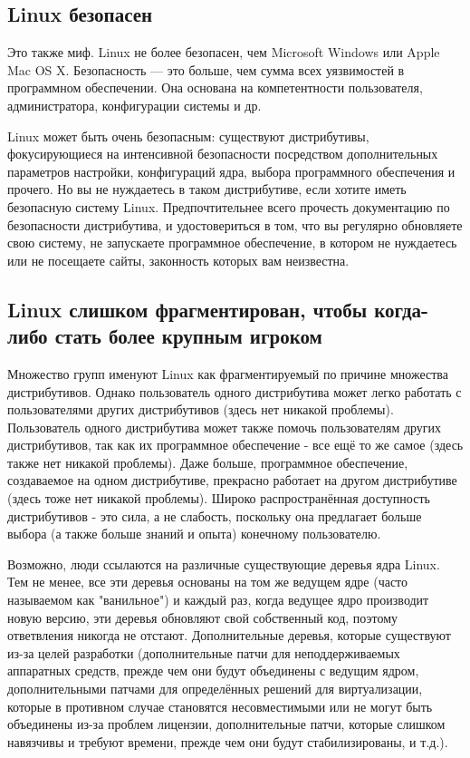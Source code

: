 \documentclass[10pt]{book}
\begin{document}
\subsection{Linux безопасен}

Это также миф. Linux не более безопасен, чем Microsoft Windows или Apple Mac OS X. Безопасность — это больше, чем сумма всех уязвимостей в программном обеспечении. Она основана на компетентности пользователя, администратора, конфигурации системы и др.

Linux может быть очень безопасным: существуют дистрибутивы,  фокусирующиеся на интенсивной безопасности посредством дополнительных параметров настройки, конфигураций ядра, выбора программного обеспечения и прочего. Но вы не нуждаетесь в таком дистрибутиве, если хотите иметь безопасную систему Linux. Предпочтительнее всего прочесть документацию по безопасности дистрибутива, и удостовериться в том, что вы регулярно обновляете свою систему, не запускаете программное обеспечение, в котором не нуждаетесь или не посещаете сайты, законность которых вам неизвестна.

\subsection{Linux слишком фрагментирован, чтобы когда-либо стать более крупным игроком}

Множество групп именуют Linux как фрагментируемый по причине множества дистрибутивов. Однако пользователь одного дистрибутива может легко работать с пользователями других дистрибутивов (здесь нет никакой проблемы). Пользователь одного дистрибутива может также помочь пользователям других дистрибутивов, так как их программное обеспечение - все ещё то же самое (здесь также нет никакой проблемы). Даже больше, программное обеспечение, создаваемое на одном дистрибутиве, прекрасно работает на другом дистрибутиве (здесь тоже нет никакой проблемы). Широко распространённая доступность дистрибутивов - это сила, а не слабость, поскольку она предлагает больше выбора (а также больше знаний и опыта) конечному пользователю.

Возможно, люди ссылаются на различные существующие деревья ядра Linux. Тем не менее, все эти деревья основаны на том же ведущем ядре (часто называемом как "ванильное") и каждый раз, когда ведущее ядро производит новую версию, эти деревья обновляют свой собственный код, поэтому ответвления никогда не отстают. Дополнительные деревья, которые существуют из-за целей разработки (дополнительные патчи для неподдерживаемых аппаратных средств, прежде чем они будут объединены с ведущим ядром, дополнительными патчами для определённых решений для виртуализации, которые в противном случае становятся несовместимыми или не могут быть объединены из-за проблем лицензии, дополнительные патчи, которые слишком навязчивы и требуют времени, прежде чем они будут стабилизированы, и т.д.).
\end{document}
